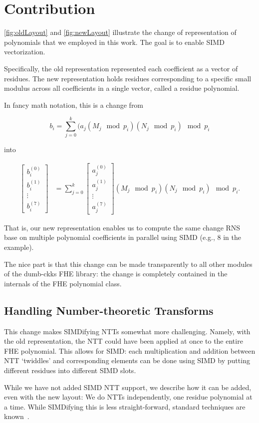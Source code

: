 \section{Contribution}

\figOldLayout
\figNewLayout

\autoref{fig:oldLayout} and \autoref{fig:newLayout} illustrate the change of
representation of polynomials that we employed in this work.
The goal is to enable SIMD vectorization.

Specifically, the old representation represented each coefficient as a vector
of residues.
The new representation holds residues corresponding to a specific small modulus
across all coefficients in a single vector, called a residue polynomial.

In fancy math notation, this is a change from

\begin{equation*}
b_i = \sum_{j=0}^k (a_j (M_j \mod p_i) (N_j \mod p_i) \mod p_i
\end{equation*}

into

\begin{align*}
    \begin{bmatrix}
        b_i^{(0)} \\
        b_i^{(1)} \\
        \vdots \\
        b_i^{(7)}
        \end{bmatrix} &= \sum_{j=0}^k \begin{bmatrix}
        a_j^{(0)} \\
        a_j^{(1)} \\
        \vdots \\
        a_j^{(7)}
        \end{bmatrix}(M_j \mod p_i) (N_j \mod p_i) \mod p_i.
\end{align*}

That is, our new representation enables us to compute the same change RNS base
on multiple polynomial coefficients in parallel using SIMD (e.g., 8 in the
example).

The nice part is that this change can be made transparently to all other
modules of the dumb-ckks FHE library: the change is completely contained in
the internals of the FHE polynomial class.

\subsection{Handling Number-theoretic Transforms}

This change makes SIMDifying NTTs somewhat more challenging. Namely, with the
old representation, the NTT could have been applied at once to the entire FHE polynomial.
This allows for SIMD: each multiplication and addition between NTT `twiddles'
and corresponding elements can be done using SIMD by putting different residues
into different SIMD slots.

While we have not added SIMD NTT support, we describe how it can be added, even
with the new layout:
We do NTTs independently, one residue polynomial at a time. While SIMDifying
this is less straight-forward, standard techniques are known~\cite{kral2003simd}.

